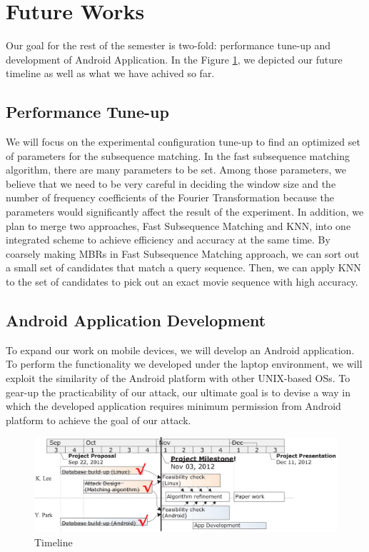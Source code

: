 \section{Future Works}
\label{sec:future}
Our goal for the rest of the semester is two-fold: performance tune-up and development of Android Application. In the Figure \ref{fig:timeline}, we depicted our future timeline as well as what we have achived so far.
\subsection{Performance Tune-up}
We will focus on the experimental configuration tune-up to find an optimized set of parameters for the subsequence matching. In the fast subsequence matching algorithm, there are many parameters to be set. Among those parameters, we believe that we need to be very careful in deciding the window size and the number of frequency coefficients of the Fourier Transformation because the parameters would significantly affect the result of the experiment.
In addition, we plan to merge two approaches, Fast Subsequence Matching and KNN, into one integrated scheme to achieve efficiency and accuracy at the same time. By coarsely making MBRs in Fast Subsequence Matching approach, we can sort out a small set of candidates that match a query sequence. Then, we can apply KNN to the set of candidates to pick out an exact movie sequence with high accuracy.
\subsection{Android Application Development}
To expand our work on mobile devices, we will develop an Android application. To perform the functionality we developed under the laptop environment, we will exploit the similarity of the Android platform with other UNIX-based OSs. To gear-up the practicability of our attack, our ultimate goal is to devise a way in which the developed application requires minimum permission from Android platform to achieve the goal of our attack.
\begin{figure}[!hb]
\centering
\includegraphics{Figures/Timeline_Mile}
\caption{Timeline}
\label{fig:timeline}
\vspace{-5mm}
\end{figure}